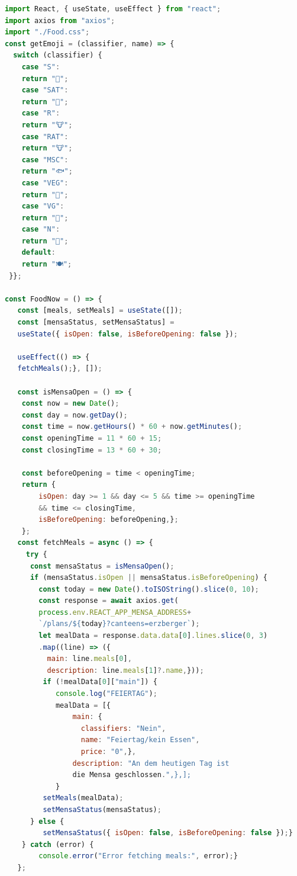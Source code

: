 \begin{lstlisting}[language=JavaScript,
	frame=single,           % Ein Rahmen um den Code
	framexleftmargin=15pt,  % Rahmen link von den Zahlen
	style=algoBericht,
	label={FoodNow-Komponente},
	captionpos=b ,          % Caption unter den Code setzen
	caption={FoodNow-Komponente}]
import React, { useState, useEffect } from "react";
import axios from "axios";
import "./Food.css";
const getEmoji = (classifier, name) => {
  switch (classifier) {
  	case "S":
  	return "🐷";
  	case "SAT":
  	return "🐷";
  	case "R":
  	return "🐮";
  	case "RAT":
  	return "🐮";
  	case "MSC":
  	return "🐟";
  	case "VEG":
  	return "🥦";
  	case "VG":
  	return "🌱";
  	case "N":
  	return "🙅";
  	default:
  	return "🍽️";
 }};

const FoodNow = () => {
   const [meals, setMeals] = useState([]);
   const [mensaStatus, setMensaStatus] = 
   useState({ isOpen: false, isBeforeOpening: false });
   
   useEffect(() => {
   fetchMeals();}, []);

   const isMensaOpen = () => {
    const now = new Date();
    const day = now.getDay();
    const time = now.getHours() * 60 + now.getMinutes();
    const openingTime = 11 * 60 + 15;
    const closingTime = 13 * 60 + 30;
 
    const beforeOpening = time < openingTime;
    return {
    	isOpen: day >= 1 && day <= 5 && time >= openingTime 
    	&& time <= closingTime,
    	isBeforeOpening: beforeOpening,};
    };
   const fetchMeals = async () => {
   	 try {
   	  const mensaStatus = isMensaOpen();
   	  if (mensaStatus.isOpen || mensaStatus.isBeforeOpening) {
   	    const today = new Date().toISOString().slice(0, 10);
   	    const response = await axios.get(
   	    process.env.REACT_APP_MENSA_ADDRESS+
   	    `/plans/${today}?canteens=erzberger`);
   	    let mealData = response.data.data[0].lines.slice(0, 3)
		.map((line) => ({
		  main: line.meals[0],
		  description: line.meals[1]?.name,}));
		 if (!mealData[0]["main"]) {
		 	console.log("FEIERTAG");
		 	mealData = [{
		 		main: {
		 		  classifiers: "Nein",
		 		  name: "Feiertag/kein Essen",
		 		  price: "0",},
	 		    description: "An dem heutigen Tag ist 
	 		    die Mensa geschlossen.",},];
 		    }
 	     setMeals(mealData);
 	     setMensaStatus(mensaStatus);
      } else {
         setMensaStatus({ isOpen: false, isBeforeOpening: false });}
	} catch (error) {
	    console.error("Error fetching meals:", error);}
   };


\end{lstlisting}
